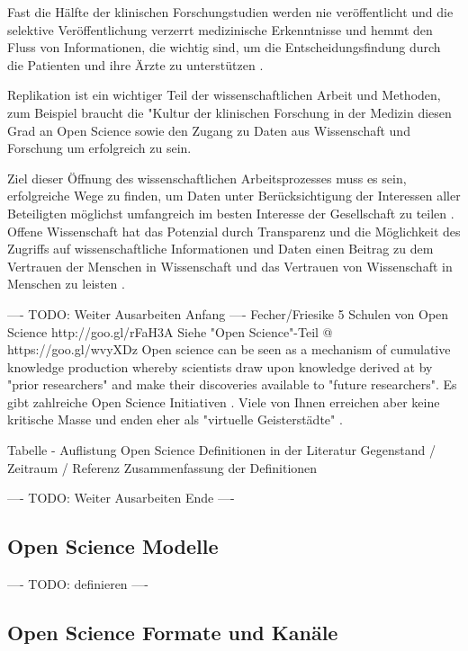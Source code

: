 Fast die Hälfte der klinischen Forschungstudien werden nie veröffentlicht und die selektive Veröffentlichung verzerrt medizinische Erkenntnisse und hemmt den Fluss von Informationen, die wichtig sind, um die Entscheidungsfindung durch die Patienten und ihre Ärzte zu unterstützen \cite{Ross_2013}.

Replikation ist ein wichtiger Teil der wissenschaftlichen Arbeit und Methoden, zum Beispiel braucht die "Kultur der klinischen Forschung in der Medizin diesen Grad an Open Science sowie den Zugang zu Daten aus Wissenschaft und Forschung um erfolgreich zu sein. \cite{Krumholz_2014}

Ziel dieser Öffnung des wissenschaftlichen Arbeitsprozesses muss es sein, erfolgreiche Wege zu finden, um Daten unter Berücksichtigung der Interessen aller Beteiligten möglichst umfangreich im besten Interesse der Gesellschaft zu teilen \cite{Ross_2013}. Offene Wissenschaft hat das Potenzial durch Transparenz und die Möglichkeit des Zugriffs auf wissenschaftliche Informationen und Daten einen Beitrag zu dem Vertrauen der Menschen in Wissenschaft und das Vertrauen von Wissenschaft in Menschen zu leisten \cite{grand_2012_open}.

---- TODO: Weiter Ausarbeiten Anfang ----
Fecher/Friesike 5 Schulen von Open Science http://goo.gl/rFaH3A
Siehe "Open Science"-Teil @ https://goo.gl/wvyXDz
Open science can be seen as a mechanism of cumulative knowledge production whereby scientists draw upon knowledge derived at by "prior researchers" and make their discoveries available to "future researchers". \cite{Mukherjee_2009}
Es gibt zahlreiche Open Science Initiativen \cite{Scheliga_2014}. Viele von Ihnen erreichen aber keine kritische Masse \cite{wrap_2010} und enden eher als "virtuelle Geisterstädte" \cite{Nielsen_2011}.

Tabelle - Auflistung Open Science Definitionen in der Literatur
Gegenstand / Zeitraum / Referenz
Zusammenfassung der Definitionen

---- TODO: Weiter Ausarbeiten Ende ----

\subsection{Open Science Modelle}
---- TODO: definieren ----

\subsection{Open Science Formate und Kanäle}

